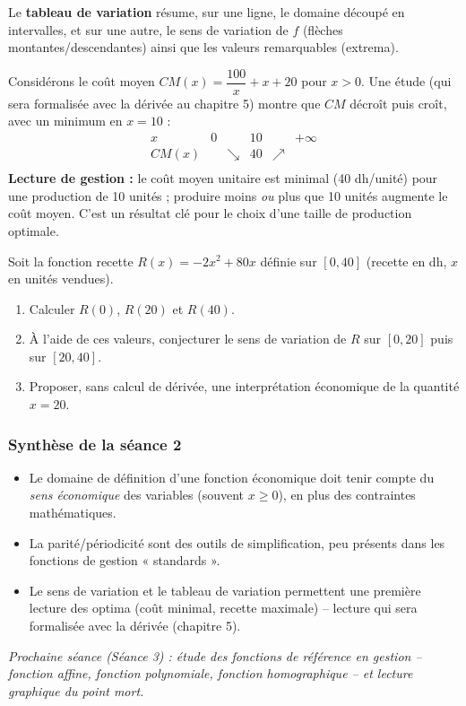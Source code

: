 \documentclass[12pt,a4paper]{article}
\begin{document}
Le \textbf{tableau de variation} résume, sur une ligne, le domaine découpé en intervalles, et sur une autre, le sens de variation de $f$ (flèches montantes/descendantes) ainsi que les valeurs remarquables (extrema).

\begin{exemplebox}
Considérons le coût moyen $CM(x) = \dfrac{100}{x} + x + 20$ pour $x>0$. Une étude (qui sera formalisée avec la dérivée au chapitre 5) montre que $CM$ décroît puis croît, avec un minimum en $x=10$ :
$$
\begin{array}{c|ccccc}
x & 0 & & 10 & & +\infty \\
\hline
CM(x) & & \searrow & 40 & \nearrow & \\
\end{array}
$$
\textbf{Lecture de gestion :} le coût moyen unitaire est minimal (40 dh/unité) pour une production de 10 unités ; produire moins \emph{ou} plus que 10 unités augmente le coût moyen. C'est un résultat clé pour le choix d'une taille de production optimale.
\end{exemplebox}

\begin{exobox}
Soit la fonction recette $R(x) = -2x^2+80x$ définie sur $[0,40]$ (recette en dh, $x$ en unités vendues).
\begin{enumerate}[label=\alph*)]
  \item Calculer $R(0)$, $R(20)$ et $R(40)$.
  \item À l'aide de ces valeurs, conjecturer le sens de variation de $R$ sur $[0,20]$ puis sur $[20,40]$.
  \item Proposer, sans calcul de dérivée, une interprétation économique de la quantité $x=20$.
\end{enumerate}
\end{exobox}

\subsubsection*{Synthèse de la séance 2}
\begin{itemize}
  \item Le domaine de définition d'une fonction économique doit tenir compte du \emph{sens économique} des variables (souvent $x\geqslant 0$), en plus des contraintes mathématiques.
  \item La parité/périodicité sont des outils de simplification, peu présents dans les fonctions de gestion « standards ».
  \item Le sens de variation et le tableau de variation permettent une première lecture des optima (coût minimal, recette maximale) -- lecture qui sera formalisée avec la dérivée (chapitre 5).
\end{itemize}

\vspace{0.5cm}
{\small\color{mundigray}\textit{Prochaine séance (Séance 3) : étude des fonctions de référence en gestion -- fonction affine, fonction polynomiale, fonction homographique -- et lecture graphique du point mort.}}
\end{document}
